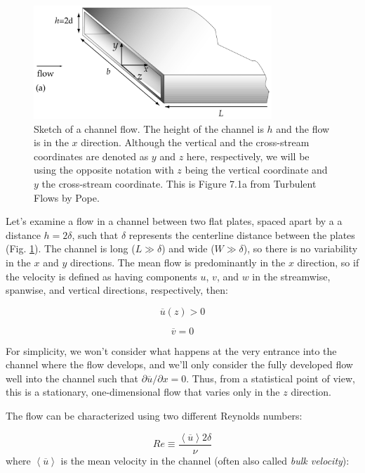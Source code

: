 \documentclass[12pt]{article}
\numberwithin{equation}{section}
\numberwithin{figure}{section}
\numberwithin{table}{section}
\begin{document}
\begin{figure}[h]
  \centering
  \includegraphics[width=0.8\textwidth]{assets/fig_channel_flow.png}
  \caption{
    Sketch of a channel flow.
    The height of the channel is $h$ and the flow is in the $x$ direction.
    Although the vertical and the cross-stream coordinates are denoted as $y$
    and $z$ here, respectively, we will be using the opposite notation with $z$
    being the vertical coordinate and $y$ the cross-stream coordinate.
    This is Figure 7.1a from Turbulent Flows by Pope.
  }
  \label{fig:channel_flow}
\end{figure}

Let's examine a flow in a channel between two flat plates, spaced apart by a
a distance $h = 2\delta$, such that $\delta$ represents the centerline distance
between the plates (Fig. \ref{fig:channel_flow}).
The channel is long ($L \gg \delta$) and wide ($W \gg \delta$), so there is no
variability in the $x$ and $y$ directions.
The mean flow is predominantly in the $x$ direction, so if the velocity is
defined as having components $u$, $v$, and $w$ in the streamwise, spanwise,
and vertical directions, respectively, then:

\begin{equation}
  \overline{u}(z) > 0
\end{equation}

\begin{equation}
  \overline{v} = 0
\end{equation}

For simplicity, we won't consider what happens at the very entrance into the
channel where the flow develops, and we'll only consider the fully developed
flow well into the channel such that $\partial \overline{u}/\partial x = 0$.
Thus, from a statistical point of view, this is a stationary, one-dimensional
flow that varies only in the $z$ direction.

The flow can be characterized using two different Reynolds numbers:

\begin{equation}
  Re \equiv \frac{\left<\overline{u}\right> 2 \delta}{\nu}
  \label{eq:Re_bulk}
\end{equation}
where $\left<\overline{u}\right>$ is the mean velocity in the channel (often also called
\textit{bulk velocity}):
\end{document}
